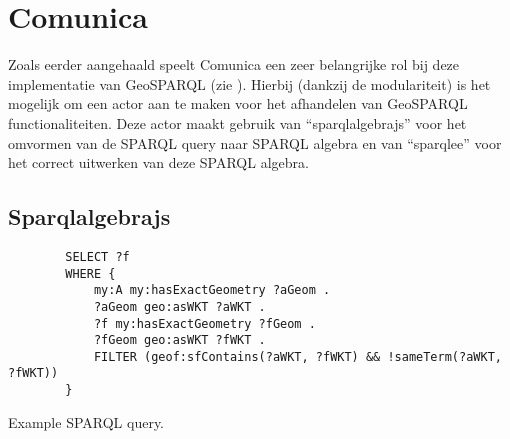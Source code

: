 \section{Comunica}
Zoals eerder aangehaald speelt Comunica een zeer belangrijke rol bij deze implementatie van GeoSPARQL (zie ). Hierbij (dankzij de modulariteit) is het mogelijk om een actor aan te maken voor het afhandelen van GeoSPARQL functionaliteiten. Deze actor maakt gebruik van ``sparqlalgebrajs'' voor het omvormen van de SPARQL query naar SPARQL algebra en van ``sparqlee'' voor het correct uitwerken van deze SPARQL algebra. 

\subsection{Sparqlalgebrajs}
\begin{listing}[ht]
    \begin{verbatim}
        SELECT ?f
        WHERE {
            my:A my:hasExactGeometry ?aGeom .
            ?aGeom geo:asWKT ?aWKT .
            ?f my:hasExactGeometry ?fGeom .
            ?fGeom geo:asWKT ?fWKT .
            FILTER (geof:sfContains(?aWKT, ?fWKT) && !sameTerm(?aWKT, ?fWKT))
        }
    \end{verbatim}
    \caption{Example SPARQL query.}
    \label{listing:sparqlalgebrajs_query}
\end{listing}

